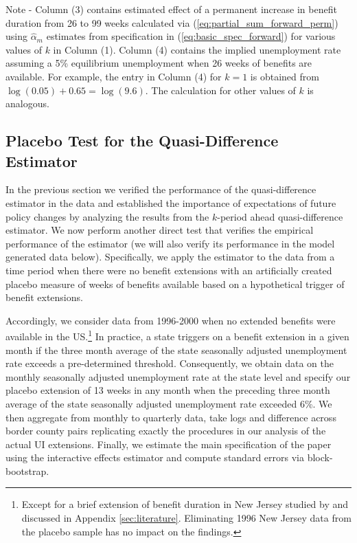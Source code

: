 \documentclass[12pt]{article}
\newcommand{\1}{\mathbf{1}}
\begin{document}
\begin{table}[t]
\centering
\caption{Estimated Permanent Effects Using $k$-Period ahead Quasi-Difference}\label{tab:Forward_Spec}

\parbox{16.5cm}{\noindent \footnotesize Note - Column (3) contains estimated effect of a permanent increase in benefit duration from 26 to 99 weeks calculated via (\ref{eq:partial_sum_forward_perm}) using $\hat{\alpha}_m$ estimates from specification in (\ref{eq:basic_spec_forward}) for various values of $k$ in Column (1). Column (4) contains the implied unemployment rate assuming a 5\% equilibrium unemployment when 26 weeks of benefits are available. For example, the entry in Column (4) for $k=1$ is obtained from $\log(0.05)+0.65=\log(9.6)$. The calculation for other values of $k$ is analogous.}
\vspace{-0.2cm}
\end{table}

\subsection{Placebo Test for the Quasi-Difference Estimator}
\label{sec:placebo_test}
In the previous section we verified the performance of the quasi-difference estimator in the data and established the importance of expectations of future policy changes by analyzing the results from the $k$-period ahead quasi-difference estimator. We now perform another direct test that verifies the empirical performance of the estimator (we will also verify its performance in the model generated data below).
Specifically, we apply the estimator to the data from a time period when there were no benefit extensions with an artificially created placebo measure of weeks of benefits available based on a hypothetical trigger of benefit extensions.

Accordingly, we consider data from 1996-2000 when no extended benefits were available in the US.\footnote{Except for a brief extension of benefit duration in New Jersey studied by \citet{card+levine:2000} and discussed in Appendix \ref{sec:literature}. Eliminating 1996 New Jersey data from the placebo sample has no impact on the findings.}
In practice, a state triggers on a benefit extension in a given month if the three month average of the state seasonally adjusted unemployment rate exceeds a pre-determined threshold. Consequently, we obtain data on the monthly seasonally adjusted unemployment rate at the state level and specify our placebo extension of 13 weeks in any month when the preceding three month average of the state seasonally adjusted unemployment rate exceeded 6\%. We then aggregate from monthly to quarterly data, take logs and difference across border county pairs replicating exactly the procedures in our analysis of the actual UI extensions. Finally, we estimate the main specification of the paper using the interactive effects estimator and compute standard errors via block-bootstrap.
\end{document}
